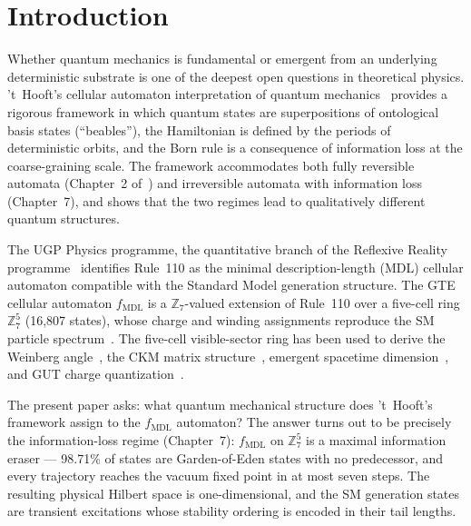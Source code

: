 \documentclass[11pt]{article}
\theoremstyle{remark}
\newcommand{\MDL}{\text{MDL}}
\begin{document}
\section{Introduction}
\label{sec:intro}

Whether quantum mechanics is fundamental or emergent from an
underlying deterministic substrate is one of the deepest open
questions in theoretical physics.
't~Hooft's cellular automaton interpretation of quantum
mechanics~\cite{tHooft2016CA} provides a rigorous framework in which
quantum states are superpositions of ontological basis states
(``beables''), the Hamiltonian is defined by the periods of deterministic
orbits, and the Born rule is a consequence of information loss at the
coarse-graining scale.
The framework accommodates both fully reversible automata
(Chapter~2 of~\cite{tHooft2016CA}) and irreversible automata with
information loss (Chapter~7), and shows that the two regimes lead to
qualitatively different quantum structures.

The UGP Physics programme, the quantitative branch of the Reflexive Reality programme~\cite{SpivackCompUniversality,SpivackResearchProgrammes}
identifies Rule~110 as the minimal description-length (MDL) cellular
automaton compatible with the Standard Model generation structure.
The GTE cellular automaton $f_{\MDL}$ is a $\mathbb{Z}_7$-valued
extension of Rule~110 over a five-cell ring $\mathbb{Z}_7^5$
(16{,}807 states), whose charge and winding assignments reproduce the
SM particle spectrum~\cite{ugp-p01}.
The five-cell visible-sector ring has been used to derive the Weinberg
angle~\cite{SpivackWeinbergAngle}, the CKM matrix
structure~\cite{SpivackCKM}, emergent spacetime
dimension~\cite{SpivackEmergentGravity}, and GUT charge
quantization~\cite{ugp-p01}.

The present paper asks: what quantum mechanical structure does 't~Hooft's
framework assign to the $f_{\MDL}$ automaton?
The answer turns out to be precisely the information-loss regime
(Chapter~7): $f_{\MDL}$ on $\mathbb{Z}_7^5$ is a maximal information
eraser --- 98.71\% of states are Garden-of-Eden states with no predecessor,
and every trajectory reaches the vacuum fixed point in at most seven
steps.
The resulting physical Hilbert space is one-dimensional, and the SM
generation states are transient excitations whose stability ordering
is encoded in their tail lengths.
\end{document}
